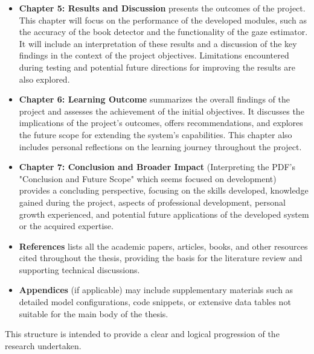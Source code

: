 \begin{itemize}
    \item \textbf{Chapter 5: Results and Discussion} presents the outcomes of the project. This chapter will focus on the performance of the developed modules, such as the accuracy of the book detector and the functionality of the gaze estimator. It will include an interpretation of these results and a discussion of the key findings in the context of the project objectives. Limitations encountered during testing and potential future directions for improving the results are also explored.

    \item \textbf{Chapter 6: Learning Outcome} summarizes the overall findings of the project and assesses the achievement of the initial objectives. It discusses the implications of the project's outcomes, offers recommendations, and explores the future scope for extending the system's capabilities. This chapter also includes personal reflections on the learning journey throughout the project.

    \item \textbf{Chapter 7: Conclusion and Broader Impact} (Interpreting the PDF's "Conclusion and Future Scope" which seems focused on development) provides a concluding perspective, focusing on the skills developed, knowledge gained during the project, aspects of professional development, personal growth experienced, and potential future applications of the developed system or the acquired expertise.

    \item \textbf{References} lists all the academic papers, articles, books, and other resources cited throughout the thesis, providing the basis for the literature review and supporting technical discussions.

    \item \textbf{Appendices} (if applicable) may include supplementary materials such as detailed model configurations, code snippets, or extensive data tables not suitable for the main body of the thesis.
\end{itemize}
This structure is intended to provide a clear and logical progression of the research undertaken.